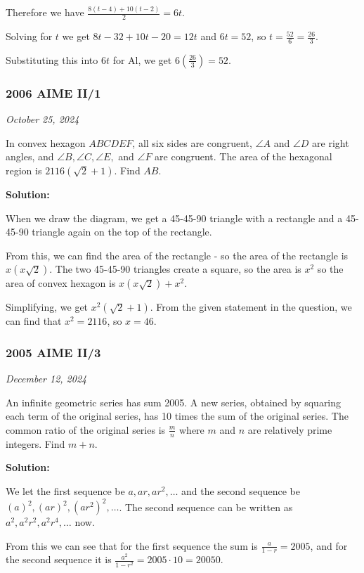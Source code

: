 \documentclass[../mathproblems.tex]{subfiles}
\begin{document}
Therefore we have $\frac{8(t-4)+10(t-2)}{2} = 6t$.

Solving for $t$ we get $8t-32+10t-20=12t$ and $6t=52$, so $t=\frac{52}{6}=\frac{26}{3}$.

Substituting this into $6t$ for Al, we get $6\left(\frac{26}{3}\right) = \boxed{52}$.

\noindent\hrulefill
\subsubsection*{2006 AIME II/1} 
\textit{October 25, 2024}

In convex hexagon $ABCDEF$, all six sides are congruent, $\angle A$ and $\angle D$ are right angles, and $\angle B, \angle C, \angle E,$ and $\angle F$ are congruent. The area of the hexagonal region is $2116(\sqrt{2}+1).$ Find $AB$.

\textbf{Solution:}

When we draw the diagram, we get a 45-45-90 triangle with a rectangle and a 45-45-90 triangle again on the top of the rectangle.

From this, we can find the area of the rectangle - so the area of the rectangle is $x(x\sqrt{2})$. The two 45-45-90 triangles create a square, so the area is $x^2$ so the area of convex hexagon is $x(x\sqrt{2})+x^2$. 

Simplifying, we get $x^2(\sqrt{2}+1)$. From the given statement in the question, we can find that $x^2=2116$, so $x=\boxed{46}$. 

\noindent\hrulefill

\subsubsection*{2005 AIME II/3}
\textit{December 12, 2024}

An infinite geometric series has sum 2005. A new series, obtained by squaring each term of the original series, has 10 times the sum of the original series. The common ratio of the original series is $\frac mn$ where $m$ and $n$ are relatively prime integers. Find $m+n.$ 

\textbf{Solution:}

We let the first sequence be $a,ar,ar^2,\dots$ and the second sequence be $(a)^2, (ar)^2, (ar^2)^2,\dots$. The second sequence can be written as $a^2, a^2r^2, a^2r^4,\dots$ now.

From this we can see that for the first sequence the sum is $\frac{a}{1-r}=2005$, and for the second sequence it is $\frac{a^2}{1-r^2}=2005\cdot 10 = 20050$.
\end{document}

